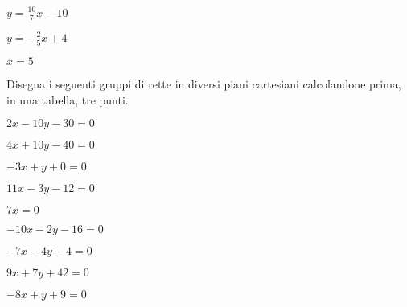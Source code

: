 \begin{esercizio}\label{ese:}
 \begin{multicols}{3}
 \begin{enumeratea}
  \item  $y = \frac{10}{7} x -10$
  \item  $y = -\frac{2}{5} x +4$
  \item  $x = 5$
 \end{enumeratea}
 \end{multicols}
\end{esercizio}

\newpage
Disegna i seguenti gruppi di rette in diversi piani cartesiani 
calcolandone prima, in una tabella, tre punti.

\begin{esercizio}\label{ese:}
 \begin{multicols}{3}
 \begin{enumeratea}
  \item  $2 x - 10 y - 30 = 0$
  \item  $4 x + 10 y - 40 = 0$
  \item  $-3 x + y + 0 = 0$
 \end{enumeratea}
 \end{multicols}
\end{esercizio}

\begin{esercizio}\label{ese:}
 \begin{multicols}{3}
 \begin{enumeratea}
  \item  $11 x - 3 y - 12 = 0$
  \item  $7 x = 0$
  \item  $-10 x - 2 y - 16 = 0$
 \end{enumeratea}
 \end{multicols}
\end{esercizio}

\begin{esercizio}\label{ese:}
 \begin{multicols}{3}
 \begin{enumeratea}
  \item  $-7 x - 4 y - 4 = 0$
  \item  $9 x + 7 y + 42 = 0$
  \item  $-8 x + y + 9 = 0$
 \end{enumeratea}
 \end{multicols}
\end{esercizio}

